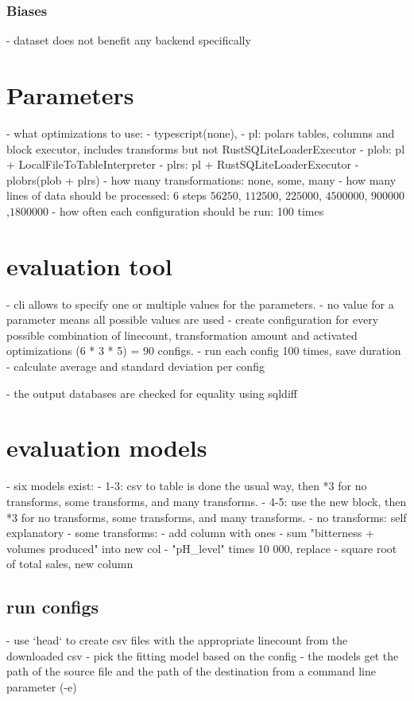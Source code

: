 \subsubsection{Biases}
- dataset does not benefit any backend specifically

\section{Parameters}
\label{section:parameters}
- what optimizations to use:
- typescript(none),
- pl: polars tables, columns and block executor, includes transforms but not RustSQLiteLoaderExecutor
- plob: pl + LocalFileToTableInterpreter
- plrs: pl + RustSQLiteLoaderExecutor
- plobrs(plob + plrs)
- how many transformations: none, some, many
- how many lines of data should be processed: $6$ steps $56250$, $112500$, $225000$, $4500000$, $900000$ ,$1800000$
- how often each configuration should be run: 100 times


\section{evaluation tool}
- cli allows to specify one or multiple values for the parameters.
- no value for a parameter means all possible values are used
- create configuration for every possible combination of linecount, transformation amount and activated optimizations (6 * 3 * 5) = 90 configs.
- run each config 100 times, save duration
- calculate average and standard deviation per config

- the output databases are checked for equality using sqldiff

\section{evaluation models}
- six models exist:
- 1-3: csv to table is done the usual way, then  *3 for no transforms, some transforms, and many transforms.
- 4-5: use the new block, then  *3 for no transforms, some transforms, and many transforms.
- no transforms: self explanatory
- some transforms:
- add column with ones
- sum "bitterness + volumes produced" into new col
-  "pH\_level" times 10 000, replace
- square root of total sales, new column

\subsection{run configs}
- use `head` to create csv files with the appropriate linecount from the downloaded csv
- pick the fitting model based on the config
- the models get the path of the source file and the path of the destination from a command line parameter (-e)



